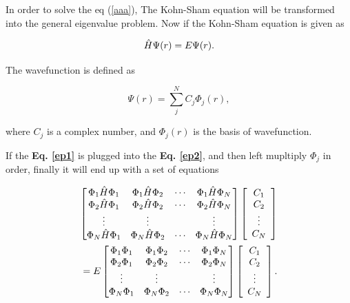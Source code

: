\documentclass[a4paper, 12pt, titlepage,oneside,drop]{kthesis}
\begin{document}
In order to solve the eq (\ref{aaa}), The Kohn-Sham equation will be transformed into the general eigenvalue problem. Now if the Kohn-Sham equation is given as

\begin{equation}\label{ep2}
 \hat{H} \Psi (r) = E \Psi (r).
\end{equation}
 

The wavefunction is defined as

\begin{equation}\label{ep1}
 \Psi (r) = \sum\limits_j^N C_j \Phi_j (r),
\end{equation}
 
where $C_j$ is a complex number, and $\Phi_j (r)$ is the basis of wavefunction. 


If the \textbf{Eq. \ref{ep1}} is plugged into the \textbf{Eq. \ref{ep2}}, and then left mupltiply $\Phi_j$ in order, finally it will end up with a set of equations

\begin{equation}\begin{split}\label{ep3}
\left[
\begin{matrix}
    \Phi_1 \hat{H} \Phi_1 & \Phi_1 \hat{H} \Phi_2 & \cdots & \Phi_1 \hat{H} \Phi_N \\
    \Phi_2 \hat{H} \Phi_1 & \Phi_2 \hat{H} \Phi_2 & \cdots & \Phi_2 \hat{H} \Phi_N \\
    \vdots               & \vdots               &        & \vdots               \\
    \Phi_N \hat{H} \Phi_1 & \Phi_N \hat{H} \Phi_2 & \cdots & \Phi_N \hat{H} \Phi_N \\
\end{matrix} \right] \left[ \begin{array}{c} C_1 \\ C_2 \\ \vdots \\ C_N\end{array} \right] \\
= E \left[
\begin{matrix}
    \Phi_1 \Phi_1 & \Phi_1 \Phi_2 & \cdots & \Phi_1 \Phi_N \\
   \Phi_2 \Phi_1 & \Phi_2 \Phi_2 & \cdots & \Phi_2 \Phi_N \\
    \vdots               & \vdots               &        & \vdots               \\
   \Phi_N \Phi_1 & \Phi_N \Phi_2 & \cdots & \Phi_N \Phi_N \\
\end{matrix} \right]\left[ \begin{array}{c} C_1 \\ C_2 \\ \vdots \\ C_N\end{array} \right].
\end{split}\end{equation}
\end{document}
